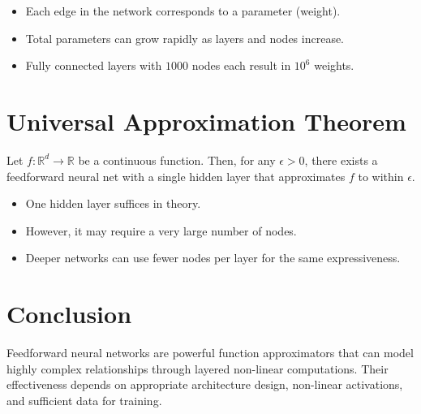 \documentclass[11pt]{article}
\begin{document}
\begin{itemize}
    \item Each edge in the network corresponds to a parameter (weight).
    \item Total parameters can grow rapidly as layers and nodes increase.
    \item Fully connected layers with $1000$ nodes each result in $10^6$ weights.
\end{itemize}

\section{Universal Approximation Theorem}

Let $f: \mathbb{R}^d \rightarrow \mathbb{R}$ be a continuous function. Then, for any $\epsilon > 0$, there exists a feedforward neural net with a single hidden layer that approximates $f$ to within $\epsilon$.

\begin{itemize}
    \item One hidden layer suffices in theory.
    \item However, it may require a very large number of nodes.
    \item Deeper networks can use fewer nodes per layer for the same expressiveness.
\end{itemize}

\section{Conclusion}

Feedforward neural networks are powerful function approximators that can model highly complex relationships through layered non-linear computations. Their effectiveness depends on appropriate architecture design, non-linear activations, and sufficient data for training.
\end{document}
